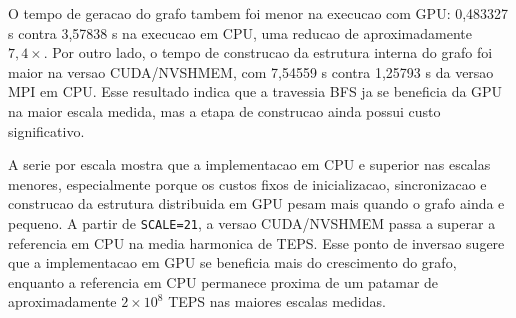 O tempo de geracao do grafo tambem foi menor na execucao com GPU: 0,483327 s
contra 3,57838 s na execucao em CPU, uma reducao de aproximadamente $7{,}4\times$.
Por outro lado, o tempo de construcao da estrutura interna do grafo foi maior na
versao CUDA/NVSHMEM, com 7,54559 s contra 1,25793 s da versao MPI em CPU. Esse
resultado indica que a travessia BFS ja se beneficia da GPU na maior escala
medida, mas a etapa de construcao ainda possui custo significativo.

\begin{table}[H]
\centering
{}
\caption{Media harmonica de TEPS por escala no computador pessoal. Os valores foram extraidos dos logs em \texttt{docs/graduate-thesis/results/cpu\_gpu\_bfs\_20260701\_230022}.}
\label{tab:teps-por-escala-pc}
\end{table}

A serie por escala mostra que a implementacao em CPU e superior nas escalas
menores, especialmente porque os custos fixos de inicializacao, sincronizacao e
construcao da estrutura distribuida em GPU pesam mais quando o grafo ainda e
pequeno. A partir de \texttt{SCALE=21}, a versao CUDA/NVSHMEM passa a superar a
referencia em CPU na media harmonica de TEPS. Esse ponto de inversao sugere que a
implementacao em GPU se beneficia mais do crescimento do grafo, enquanto a
referencia em CPU permanece proxima de um patamar de aproximadamente $2 \times
10^8$ TEPS nas maiores escalas medidas.

